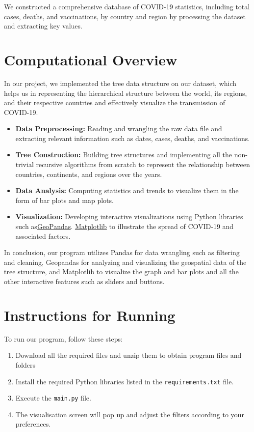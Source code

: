 \documentclass[fontsize=11pt]{article}
\begin{document}
We constructed a comprehensive database of COVID-19 statistics, including total cases, deaths, and vaccinations, by country and region by processing the dataset and extracting key values.

\section{Computational Overview}
In our project, we implemented the tree data structure on our dataset, which helps us in representing the hierarchical structure between the world, its regions, and their respective countries and effectively visualize the transmission of COVID-19.

\begin{itemize}
  \item \textbf{Data Preprocessing:} Reading and wrangling the raw data file and extracting relevant information such as dates, cases, deaths, and vaccinations.
  \item \textbf{Tree Construction:} Building tree structures and implementing all the non-trivial recursive algorithms from scratch to represent the relationship between countries, continents, and regions over the years.
  \item \textbf{Data Analysis:} Computing statistics and trends to visualize them in the form of bar plots and map plots.
  \item \textbf{Visualization:} Developing interactive visualizations using Python libraries such as\href{https://geopandas.org/en/stable/}{GeoPandas}\cite{geopandas}. \href{https://matplotlib.org/}{Matplotlib} \cite{matplotlib} to illustrate the spread of COVID-19 and associated factors.
\end{itemize}

In conclusion, our program utilizes Pandas for data wrangling such as filtering and cleaning, Geopandas for analyzing and visualizing the geospatial data of the tree structure, and Matplotlib to visualize the graph and bar plots and all the other interactive features such as sliders and buttons.

\section{Instructions for Running}
To run our program, follow these steps:

\begin{enumerate}
 \item Download all the required files and unzip them to obtain program files and folders 
 \item Install the required Python libraries listed in the \texttt{requirements.txt} file.
  \item Execute the \texttt{main.py} file.
  \item The visualisation screen will pop up and adjust the filters according to your preferences.
  
\end{enumerate}
\end{document}
